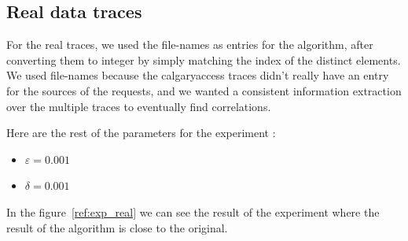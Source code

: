 \documentclass[a4paper]{article}%
\begin{document}
\subsection{Real data traces}

For the real traces, we used the file-names as entries for the algorithm, after converting them to integer by simply matching the index of the distinct elements. We used file-names because the calgaryaccess traces didn't really have an entry for the sources of the requests, and we wanted a consistent information extraction over the multiple traces to eventually find correlations.

Here are the rest of the parameters for the experiment :

\begin{itemize}
	\item $\varepsilon = 0.001$
	\item $\delta = 0.001$
\end{itemize}

In the figure~\ref{ref:exp_real} we can see the result of the experiment where the result of the algorithm is close to the original.
\end{document}

